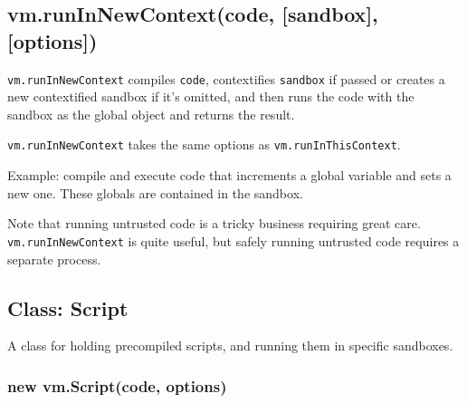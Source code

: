 \subsection{vm.runInNewContext(code, {[}sandbox{]},
{[}options{]})}\label{vm.runinnewcontextcode-sandbox-options}

\texttt{vm.runInNewContext} compiles \texttt{code}, contextifies
\texttt{sandbox} if passed or creates a new contextified sandbox if it's
omitted, and then runs the code with the sandbox as the global object
and returns the result.

\texttt{vm.runInNewContext} takes the same options as
\texttt{vm.runInThisContext}.

Example: compile and execute code that increments a global variable and
sets a new one. These globals are contained in the sandbox.

\begin{Shaded}
\begin{Highlighting}[]
 \NormalTok{(}\NormalTok{);}
 \NormalTok{(}\NormalTok{),}

 
  \NormalTok{: }\NormalTok{,}
  \NormalTok{: }
\NormalTok{\};}

\NormalTok{(}
\NormalTok{(}

\end{Highlighting}
\end{Shaded}

Note that running untrusted code is a tricky business requiring great
care. \texttt{vm.runInNewContext} is quite useful, but safely running
untrusted code requires a separate process.

\subsection{Class: Script}\label{class-script}

A class for holding precompiled scripts, and running them in specific
sandboxes.

\subsubsection{new vm.Script(code,
options)}\label{new-vm.scriptcode-options}

